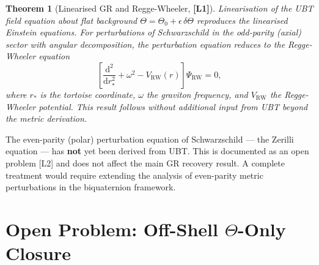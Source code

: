 \documentclass[12pt,a4paper]{article}
\newtheorem{theorem}{Theorem}[section]
\theoremstyle{definition}
\theoremstyle{remark}
\newcommand{\Lone}{\textbf{[L1]}}
\newcommand{\Ltwo}{\textbf{[L2]}}
\newcommand{\OPEN}{\textbf{[OPEN]}}
\begin{document}
\begin{theorem}[Linearised GR and Regge-Wheeler, \Lone]
\label{thm:regge_wheeler}
Linearisation of the UBT field equation about flat background
$\Theta = \Theta_0 + \epsilon\,\delta\Theta$ reproduces the linearised
Einstein equations.  For perturbations of Schwarzschild in the odd-parity
(axial) sector with angular decomposition, the perturbation equation reduces
to the Regge-Wheeler equation
\[
  \left[\frac{\mathrm{d}^2}{\mathrm{d}r_*^2} + \omega^2
        - V_{\mathrm{RW}}(r)\right]\Psi_{\mathrm{RW}} = 0,
\]
where $r_*$ is the tortoise coordinate, $\omega$ the graviton frequency, and
$V_{\mathrm{RW}}$ the Regge-Wheeler potential.
This result follows without additional input from UBT beyond the metric derivation.
\end{theorem}

\begin{tcolorbox}[colback=orange!5!white,colframe=orange!60!black,
  title=Open: Zerilli equation (even-parity) \OPEN~\Ltwo]
The even-parity (polar) perturbation equation of Schwarzschild — the Zerilli
equation — has \textbf{not} yet been derived from UBT.
This is documented as an open problem [L2] and does not affect the main GR
recovery result.  A complete treatment would require extending the analysis of
even-parity metric perturbations in the biquaternion framework.
\end{tcolorbox}

\section{Open Problem: Off-Shell $\Theta$-Only Closure}
\label{sec:gap}
\end{document}
